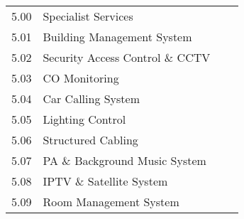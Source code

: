 \begin{longtable}{llll}
\midrule
5.00	&Specialist Services		&&\\
5.01	&Building Management System	&&\\	
5.02	&Security Access Control \& CCTV	&&\\	
5.03	&CO Monitoring		&&\\
5.04	&Car Calling System		&&\\
5.05	&Lighting Control		&&\\
5.06	&Structured Cabling		&&\\
5.07	&PA \& Background Music System &&\\		
5.08	&IPTV \& Satellite System	&&\\	
5.09	&Room Management System	&&\\

\bottomrule
\end{longtable}

